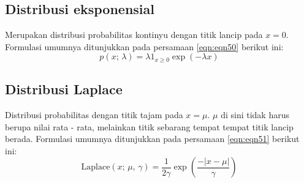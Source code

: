 \subsection{Distribusi eksponensial}
Merupakan distribusi probabilitas kontinyu dengan titik lancip pada $x = 0$. Formulasi umumnya ditunjukkan pada persamaan \ref{eqn:eqn50} berikut ini:
\begin{equation}
    p(x;\,\lambda) = \lambda1_{x \geq 0} \exp{(-\lambda x)}
    \label{eqn:eqn50}
\end{equation}

\subsection{Distribusi Laplace}
Distribusi probabilitas dengan titik tajam pada $x = \mu$. $\mu$ di sini tidak harus berupa nilai rata - rata, melainkan titik sebarang tempat tempat titik lancip berada. Formulasi umumnya ditunjukkan pada persamaan \ref{eqn:eqn51} berikut ini:
\begin{equation}
      \text{Laplace}(x;\,\mu,\, \gamma) = \frac{1}{2\gamma}\exp{\left(\frac{-|x - \mu|}{\gamma}\right)}
      \label{eqn:eqn51}
\end{equation}

